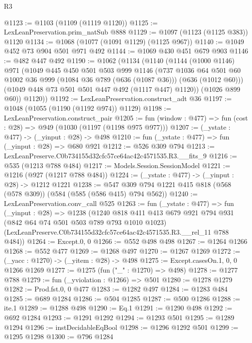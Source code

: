 \begin{lexlean}{R3}
\begin{coremodule}
@1123 := @1103 (@1109 (@1119 @1120))
@1125 := LexLeanPreservation.prim_natSub @888
@1129 := @1097 (@1123 (@1125 @383)) @1120
@1134 := @1068 (@1077 (@1091 @1129) (@1125 @967))
@1140 := @1049 @452 @73 @904 @501 @971 @492
@1144 := @1069 @430 @451 @679 @903
@1146 := @482 @447 @492
@1190 := @1062
    (@1134
      (@1140
        (@1144
          (@1000 @1146)
          @971
          (@1049
            @445
            @450
            @501
            @503
            @999
            @1146
            (@737
              @1036
              @64
              @501
              @60
              @1002
              @36
              @999
              (@1084 @36 @789 (@636 (@1087 @36)))
              (@636 (@1012 @60)))
            (@1049 @448 @73 @501 @501 @447 @492 (@1117 @447) @1120))
          (@1026 @899 @60))
        @1120))
@1192 := LexLeanPreservation.construct_adt @36
@1197 := @1048 (@1055 (@1190 (@1192 @974)) @1129)
@1198 := LexLeanPreservation.construct_pair
@1205 := fun (window : @477) => fun (cost : @28) => @949 (@1030 (@1197 (@1198 @975 @977)))
@1207 := (_ystate : @477) -> (_yinput : @28) -> @498
@1210 := fun (_ystate : @477) => fun (_yinput : @28) => @680 @921
@1212 := @526 @309 @794
@1213 := LexLeanPreserve.C0b734155d32cfc57ce64ac42c4571535.R3.__fits_9
@1216 := @535 (@1213 @788 @484)
@1217 := Models.Session.SessionModel
@1221 := @1216 (@927 (@1217 @788 @484))
@1224 := (_ystate : @477) -> (_yinput : @28) -> @1212 @1221
@1238 := @547 @309 @794 @1221 @415 @818 (@568 (@578 @309)) (@584 (@585 (@586 @415) @794 @562))
@1240 := LexLeanPreservation.conv_call @525
@1263 := fun (_ystate : @477) =>
  fun (_yinput : @28) =>
  @1238
    (@1240
      @818
      @411
      @413
      @679
      @921
      @794
      @931
      (@842 @64 @74 @501 @503 @789 @793 @1010 @1023)
      (LexLeanPreserve.C0b734155d32cfc57ce64ac42c4571535.R3.__rel_11 @788 @484))
@1264 := Except.{0, 0}
@1266 := @552 @498 @498
@1267 := @1264 @1266
@1268 := @552 @477
@1269 := @1268 @497
@1270 := @1267 @1269
@1272 := (_yacc : @1270) -> (_yitem : @28) -> @498
@1275 := Except.casesOn.{1, 0, 0} @1266 @1269
@1277 := @1275 (fun ("_" : @1270) => @498)
@1278 := @1277 @788
@1279 := fun (_yviolation : @1266) => @501
@1280 := @1278 @1279
@1282 := Prod.fst.{0, 0} @477
@1283 := @1282 @497
@1284 := @1283 @484
@1285 := @689 @1284
@1286 := @504 @1285
@1287 := @500 @1286
@1288 := ite.{1}
@1289 := @1288 @498
@1290 := Eq.{1}
@1291 := @1290 @498
@1292 := @692 @1284
@1293 := @1291 @1292
@1294 := @1293 @501
@1295 := @1289 @1294
@1296 := instDecidableEqBool
@1298 := @1296 @1292 @501
@1299 := @1295 @1298
@1300 := @796 @1284

\end{coremodule}
\end{lexlean}
